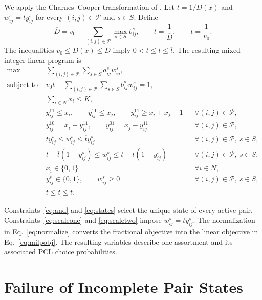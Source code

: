 \documentclass[10pt]{article}
\begin{document}
We apply the Charnes--Cooper transformation of \citet{charnes1962}. Let $t=1/D(x)$ and $w_{ij}^s=t y_{ij}^s$ for every $(i,j)\in\mathcal P$ and $s\in S$. Define
\begin{equation}
\overline D
=
v_0+
\sum_{(i,j)\in\mathcal P}
\max_{s\in S} b_{ij}^s,
\qquad
\underline t=\frac{1}{\overline D},
\qquad
\overline t=\frac{1}{v_0}.
\label{eq:tbounds}
\end{equation}
The inequalities $v_0\le D(x)\le\overline D$ imply $0<\underline t\le t\le\overline t$. The resulting mixed-integer linear program is
\begin{align}
\max\quad
&
\sum_{(i,j)\in\mathcal P}
\sum_{s\in S}
a_{ij}^s w_{ij}^s,
\label{eq:milpobj}\\
\text{subject to}\quad
&
v_0t+
\sum_{(i,j)\in\mathcal P}
\sum_{s\in S}
b_{ij}^s w_{ij}^s
=
1,
\label{eq:normalize}\\
&
\sum_{i\in N}x_i\le K,
\label{eq:cardinality}\\
&
y_{ij}^{11}\le x_i,\qquad
y_{ij}^{11}\le x_j,\qquad
y_{ij}^{11}\ge x_i+x_j-1
&&
\forall (i,j)\in\mathcal P,
\label{eq:and}\\
&
y_{ij}^{10}=x_i-y_{ij}^{11},\qquad
y_{ij}^{01}=x_j-y_{ij}^{11}
&&
\forall (i,j)\in\mathcal P,
\label{eq:states}\\
&
\underline t y_{ij}^s
\le
w_{ij}^s
\le
\overline t y_{ij}^s
&&
\forall (i,j)\in\mathcal P,\ s\in S,
\label{eq:scaleone}\\
&
t-\overline t(1-y_{ij}^s)
\le
w_{ij}^s
\le
t-\underline t(1-y_{ij}^s)
&&
\forall (i,j)\in\mathcal P,\ s\in S,
\label{eq:scaletwo}\\
&
x_i\in\{0,1\}
&&
\forall i\in N,
\label{eq:domainX}\\
&
y_{ij}^s\in\{0,1\},\qquad
w_{ij}^s\ge0
&&
\forall (i,j)\in\mathcal P,\ s\in S,
\label{eq:domainY}\\
&
\underline t\le t\le\overline t.
\label{eq:domainT}
\end{align}

Constraints~\eqref{eq:and} and \eqref{eq:states} select the unique state of every active pair. Constraints~\eqref{eq:scaleone} and \eqref{eq:scaletwo} impose $w_{ij}^s=t y_{ij}^s$. The normalization in Eq.~\eqref{eq:normalize} converts the fractional objective into the linear objective in Eq.~\eqref{eq:milpobj}. The resulting variables describe one assortment and its associated PCL choice probabilities.

\section{Failure of Incomplete Pair States}
\end{document}
